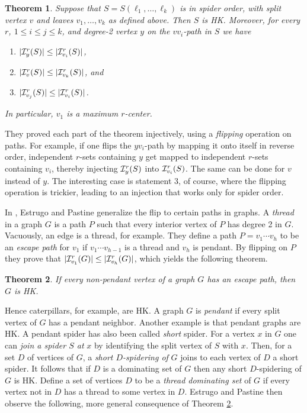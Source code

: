 \documentclass{article}
\newtheorem{thm}{Theorem}%
\def\cI{{\cal I}}
\def\hk{{\sf HK}}
\begin{document}
\begin{thm}
\label{t:SpiderHK}
Suppose that $S=S(\ell_1,\ldots,\ell_k)$ is in spider order, with split vertex $v$ and leaves $v_1,\ldots,v_k$ as defined above.
Then $S$ is \hk.
Moreover, for every $r$, $1\le i\le j\le k$, and degree-2 vertex $y$ on the $vv_i$-path in $S$ we have
\begin{enumerate}
    \item 
    $|\cI_y^r(S)|\le |\cI_{v_i}^r(S)|$,
    \item 
    $|\cI_v^r(S)|\le |\cI_{v_k}^r(S)|$, and
    \item 
    $|\cI_{v_j}^r(S)|\le |\cI_{v_i}^r(S)|$.
\end{enumerate}
In particular, $v_1$ is a maximum $r$-center.
\end{thm}

They proved each part of the theorem injectively, using a {\it flipping} operation on paths.
For example, if one flips the $yv_i$-path by mapping it onto itself in reverse order, independent $r$-sets containing $y$ get mapped to independent $r$-sets containing $v_i$, thereby injecting $\cI_y^r(S)$ into $\cI_{v_i}^r(S)$.
The same can be done for $v$ instead of $y$.
The interesting case is statement 3, of course, where the flipping operation is trickier, leading to an injection that works only for spider order.

In \cite{EstrPast}, Estrugo and Pastine generalize the flip to certain paths in graphs.
A {\it thread} in a graph $G$ is a path $P$ such that every interior vertex of $P$ has degree 2 in $G$.
Vacuously, an edge is a thread, for example.
They define a path $P=v_1\cdots v_h$ to be an {\it escape path} for $v_1$ if $v_1\cdots v_{h-1}$ is a thread and $v_h$ is pendant.
By flipping on $P$ they prove that $|\cI_{v_1}^r(G)|\le |\cI_{v_h}^r(G)|$, which yields the following theorem.

\begin{thm}
\label{t:Escape}
If every non-pendant vertex of a graph $G$ has an escape path, then $G$ is \hk.
\end{thm}

Hence caterpillars, for example, are \hk.
A graph $G$ is {\it pendant} if every split vertex of $G$ has a pendant neighbor.
Another example is that pendant graphs are \hk.
A pendant spider has also been called {\it short} spider.
For a vertex $x$ in $G$ one can {\it join a spider $S$ at} $x$ by identifying the split vertex of $S$ with $x$.
Then, for a set $D$ of vertices of $G$, a {\it short $D$-spidering of} $G$ joins to each vertex of $D$ a short spider.
It follows that if $D$ is a dominating set of $G$ then any short $D$-spidering of $G$ is \hk.
Define a set of vertices $D$ to be a {\it thread dominating set} of $G$ if every vertex not in $D$ has a thread to some vertex in $D$.
Estrugo and Pastine then observe the following, more general consequence of Theorem \ref{t:Escape}.
\end{document}
